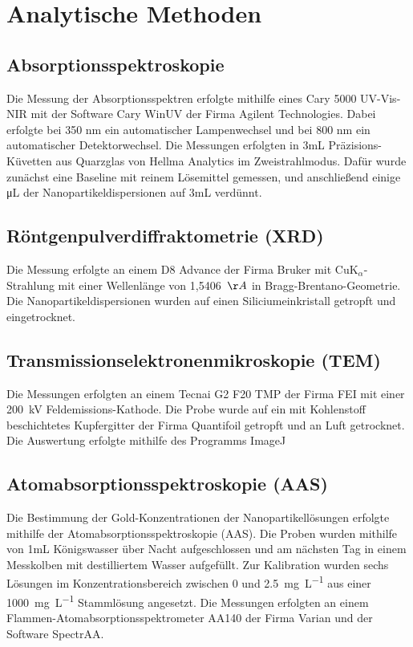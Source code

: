 \section{Analytische Methoden}

\subsection{Absorptionsspektroskopie}
	Die Messung der Absorptionsspektren erfolgte mithilfe eines Cary 5000 UV-Vis-NIR mit
	der Software Cary WinUV der Firma Agilent Technologies. 
	Dabei erfolgte bei 350 nm ein automatischer Lampenwechsel und bei 800 nm ein automatischer Detektorwechsel.
	Die	Messungen erfolgten in 3mL Präzisions-Küvetten aus Quarzglas von Hellma	Analytics im Zweistrahlmodus. 
	Dafür wurde zunächst eine Baseline mit reinem Lösemittel gemessen, und anschließend einige \si{\micro\liter} der Nanopartikeldispersionen auf 3mL verdünnt.

\subsection{Röntgenpulverdiffraktometrie (XRD)}
	Die Messung erfolgte an einem D8 Advance der Firma Bruker mit CuK$_{\alpha}$-Strahlung mit einer Wellenlänge von 1,5406~$\AA$ in Bragg-Brentano-Geometrie.
	Die Nanopartikeldispersionen wurden auf einen Siliciumeinkristall getropft und eingetrocknet.
	
\subsection{Transmissionselektronenmikroskopie (TEM)}
	Die Messungen erfolgten an einem Tecnai G2 F20 TMP der Firma FEI mit einer 200~kV
	Feldemissions-Kathode. 
	Die Probe wurde auf ein mit Kohlenstoff beschichtetes Kupfergitter der Firma
	Quantifoil getropft und an Luft getrocknet.
	Die Auswertung erfolgte mithilfe des Programms ImageJ


\subsection{Atomabsorptionsspektroskopie (AAS)}
	Die Bestimmung der Gold-Konzentrationen der Nanopartikellösungen erfolgte mithilfe
	der Atomabsorptionsspektroskopie (AAS). 
	Die Proben wurden mithilfe von 1mL Königswasser über Nacht aufgeschlossen und am
	nächsten Tag in einem Messkolben mit destilliertem Wasser aufgefüllt. Zur Kalibration wurden sechs Lösungen im Konzentrationsbereich zwischen 0 und \SI{2,5}{\milli\gram\liter\tothe{-1}} aus einer
	\SI{1000}{\milli\gram\liter\tothe{-1}} Stammlösung angesetzt.
	Die Messungen erfolgten an einem Flammen-Atomabsorptionsspektrometer AA140 der
	Firma Varian und der Software SpectrAA.